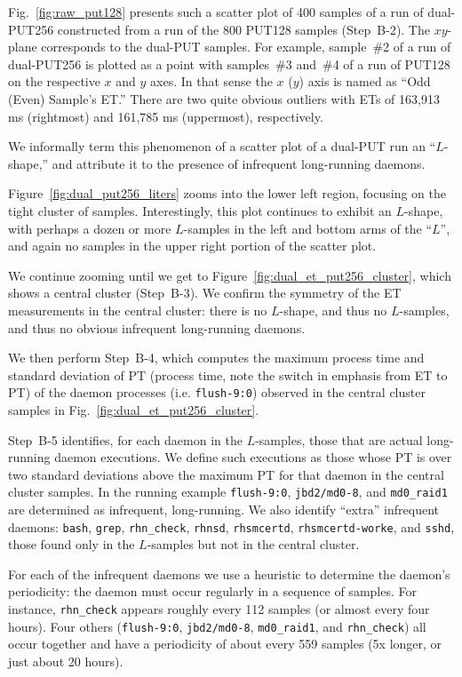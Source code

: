 \documentclass[letter]{ieice}
\begin{document}
Fig.~\ref{fig:raw_put128} presents such a scatter plot 
of 400 samples of a run of \hbox{dual-PUT256} constructed 
from a run of the 800 PUT128 samples ({\color{blue}Step~B-2}). 
The $xy$-plane corresponds to the dual-PUT samples. 
For example, \hbox{sample}~\#{2} of a run of dual-PUT256 
is plotted as a point with samples~\#{3} and~\#{4} of a run of PUT128 
on the respective $x$ and $y$ axes. In that sense 
the $x$ ($y$) axis is named as ``Odd (Even) Sample's ET.''
There are two quite obvious outliers with ETs 
of 163,913 ms (rightmost) and 161,785 ms (uppermost), respectively.

We informally term this phenomenon of a scatter plot of a dual-PUT run an
``$L$-shape,'' and attribute it to the
presence of infrequent long-running daemons.

Figure~\ref{fig:dual_put256_liters} zooms into the lower left region,
focusing on the
tight cluster of samples.  Interestingly, this plot continues to exhibit an
$L$-shape, with perhaps a dozen or more $L$-samples in the left and bottom arms of
the ``$L$'', and again no samples in the upper right portion of the
scatter plot.

We continue zooming until we get to Figure~\ref{fig:dual_et_put256_cluster},
which shows a central cluster ({\color{blue}Step~B-3}). 
We confirm the symmetry of the ET measurements in the central cluster: there
is no $L$-shape, and thus no $L$-samples, and thus no obvious infrequent
long-running daemons.

We then perform {\color{blue}Step~B-4}, which computes 
the maximum process time and standard deviation 
of PT (process time, note the switch in emphasis from ET to PT) of the daemon processes
(i.e. {\tt flush-9:0}) 
observed in the central cluster samples in Fig.~\ref{fig:dual_et_put256_cluster}. 

{\color{blue}Step~B-5} identifies, for each daemon in the \hbox{$L$-samples}, 
those that are actual long-running daemon
executions.  We define such executions as those whose PT 
is over two standard deviations above the maximum PT for
that daemon in the central cluster samples. 
In the running example  {\tt flush-9:0}, 
{\tt jbd2/md0-8}, and {\tt md0\_raid1} 
are determined as infrequent, \hbox{long-running}.
We also identify ``extra'' infrequent daemons: 
{\tt bash}, {\tt grep}, {\tt rhn\_check}, {\tt rhnsd}, {\tt rhsmcertd}, 
{\tt rhsmcertd-worke}, and {\tt sshd}, those 
found only in the $L$-samples but not in the central cluster. 

For each of the infrequent daemons 
we use a heuristic to determine the daemon's periodicity:
the daemon must occur regularly in a sequence of samples.
For instance, {\tt rhn\_check} appears 
roughly every 112 samples (or almost every four hours). 
Four others ({\tt flush-9:0}, {\tt jbd2/md0-8}, {\tt md0\_raid1}, and {\tt rhn\_check}) 
all occur together and have a periodicity of about every 559 samples 
(5x longer, or just about 20 hours). 
\end{document}
